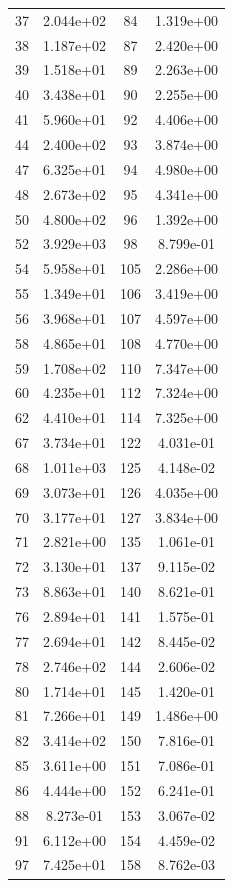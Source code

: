\documentclass[12pt]{article}
\begin{document}
\begin{longtable}{@{}cccc@{}}
37 & 2.044e+02 & 84 & 1.319e+00 \\
38 & 1.187e+02 & 87 & 2.420e+00 \\
39 & 1.518e+01 & 89 & 2.263e+00 \\
40 & 3.438e+01 & 90 & 2.255e+00 \\
41 & 5.960e+01 & 92 & 4.406e+00 \\
44 & 2.400e+02 & 93 & 3.874e+00 \\
47 & 6.325e+01 & 94 & 4.980e+00 \\
48 & 2.673e+02 & 95 & 4.341e+00 \\
50 & 4.800e+02 & 96 & 1.392e+00 \\
52 & 3.929e+03 & 98 & 8.799e-01 \\
54 & 5.958e+01 & 105 & 2.286e+00 \\
55 & 1.349e+01 & 106 & 3.419e+00 \\
56 & 3.968e+01 & 107 & 4.597e+00 \\
58 & 4.865e+01 & 108 & 4.770e+00 \\
59 & 1.708e+02 & 110 & 7.347e+00 \\
60 & 4.235e+01 & 112 & 7.324e+00 \\
62 & 4.410e+01 & 114 & 7.325e+00 \\
67 & 3.734e+01 & 122 & 4.031e-01 \\
68 & 1.011e+03 & 125 & 4.148e-02 \\
69 & 3.073e+01 & 126 & 4.035e+00 \\
70 & 3.177e+01 & 127 & 3.834e+00 \\
71 & 2.821e+00 & 135 & 1.061e-01 \\
72 & 3.130e+01 & 137 & 9.115e-02 \\
73 & 8.863e+01 & 140 & 8.621e-01 \\
76 & 2.894e+01 & 141 & 1.575e-01 \\
77 & 2.694e+01 & 142 & 8.445e-02 \\
78 & 2.746e+02 & 144 & 2.606e-02 \\
80 & 1.714e+01 & 145 & 1.420e-01 \\
81 & 7.266e+01 & 149 & 1.486e+00 \\
82 & 3.414e+02 & 150 & 7.816e-01 \\
85 & 3.611e+00 & 151 & 7.086e-01 \\
86 & 4.444e+00 & 152 & 6.241e-01 \\
88 & 8.273e-01 & 153 & 3.067e-02 \\
91 & 6.112e+00 & 154 & 4.459e-02 \\
97 & 7.425e+01 & 158 & 8.762e-03 \\

\end{longtable}
\end{document}
